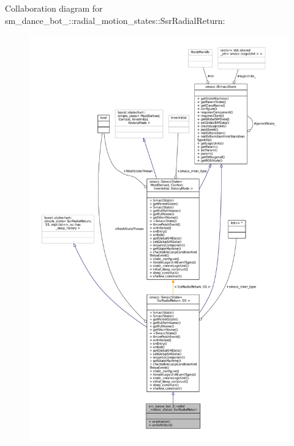 Collaboration diagram for sm\+\_\+dance\+\_\+bot\+\_\+:\+:radial\+\_\+motion\+\_\+states\+:\+:Ssr\+Radial\+Return\+:
\nopagebreak
\begin{figure}[H]
\begin{center}
\leavevmode
\includegraphics[width=350pt]{structsm__dance__bot__2_1_1radial__motion__states_1_1SsrRadialReturn__coll__graph}
\end{center}
\end{figure}
